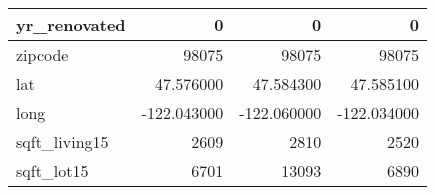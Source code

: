 \begin{table}[H]
\begin{tabular}{|l|r|r|r|}
\hline yr\_renovated & \cellcolor[rgb]{0.9, 0.54, 0.52} 0 & \cellcolor[rgb]{0.9, 0.54, 0.52} 0 & \cellcolor[rgb]{0.9, 0.54, 0.52} 0 \\
\hline zipcode & \cellcolor[rgb]{0.9, 0.54, 0.52} 98075 & \cellcolor[rgb]{0.9, 0.54, 0.52} 98075 & \cellcolor[rgb]{0.9, 0.54, 0.52} 98075 \\
\hline lat & \cellcolor[rgb]{0.9, 0.54, 0.52} 47.576000 & 47.584300 & 47.585100 \\
\hline long & \cellcolor[rgb]{0.9, 0.54, 0.52} -122.043000 & \cellcolor[rgb]{0.9, 0.54, 0.52} -122.060000 & \cellcolor[rgb]{0.9, 0.54, 0.52} -122.034000 \\
\hline sqft\_living15 & \cellcolor[rgb]{0.9, 0.54, 0.52} 2609 & 2810 & 2520 \\
\hline sqft\_lot15 & \cellcolor[rgb]{0.9, 0.54, 0.52} 6701 & 13093 & 6890 \\
\hline
\end{tabular}
\end{table}
